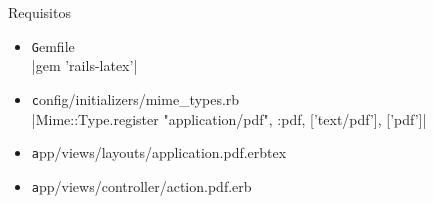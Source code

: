 \documentclass{beamer}
\begin{document}
  \begin{frame}{Requisitos} 
    \begin{center} 
      \begin{itemize}
        \item {\texttt Gemfile}\\|gem 'rails-latex'|
        \item {\texttt config/initializers/mime\_types.rb}\\{\scriptsize {}|Mime::Type.register "application/pdf", :pdf, ['text/pdf'], ['pdf']|}
        \item {\texttt app/views/layouts/application.pdf.erbtex}
        \item {\texttt app/views/controller/action.pdf.erb}
      \end{itemize}
    \end{center}
  \end{frame}
  \begin{frame}[plain] 
    \titlepage
  \end{frame}
\end{document}
